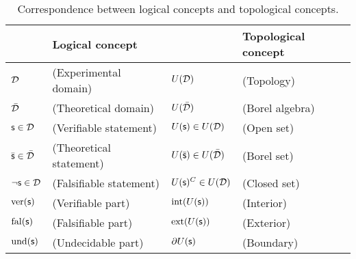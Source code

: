 \documentclass[twocolumn]{article}
\begin{document}
\begin{table*}[h]
	\centering
	\begin{tabular}{p{} p{} p{} p{}}
		& Logical concept & & Topological concept  \\ 
		\hline 
		$\mathcal{D}$ & (Experimental domain) & $U(\mathcal{D})$ & (Topology) \\ 
		$\bar{\mathcal{D}}$ & (Theoretical domain) & $U(\bar{\mathcal{D}})$ & (Borel algebra) \\ 
		$\mathsf{s} \in \mathcal{D}$ & (Verifiable statement) & $U(\mathsf{s}) \in U(\mathcal{D})$ & (Open set) \\ 
		$\bar{\mathsf{s}} \in \bar{\mathcal{D}}$ & (Theoretical statement) & $U(\bar{\mathsf{s}}) \in U(\bar{\mathcal{D}})$ & (Borel set) \\ 		$\neg\mathsf{s} \in \mathcal{D}$ & (Falsifiable statement) & $U(\mathsf{s})^C  \in U(\mathcal{D})$ & (Closed set) \\ 
		$\operatorname{ver}(\mathsf{s})$ & (Verifiable part) & $\operatorname{int}(U(\mathsf{s}))$ & (Interior) \\ 
		$\operatorname{fal}(\mathsf{s})$ & (Falsifiable part) & $\operatorname{ext}(U(\mathsf{s}))$ & (Exterior) \\ 
		$\operatorname{und}(\mathsf{s})$ & (Undecidable part) & $\partial U(\mathsf{s})$ & (Boundary) 
	\end{tabular} 
	\caption{Correspondence between logical concepts and topological concepts.}\label{tab:statement_topology}
\end{table*}
\end{document}

